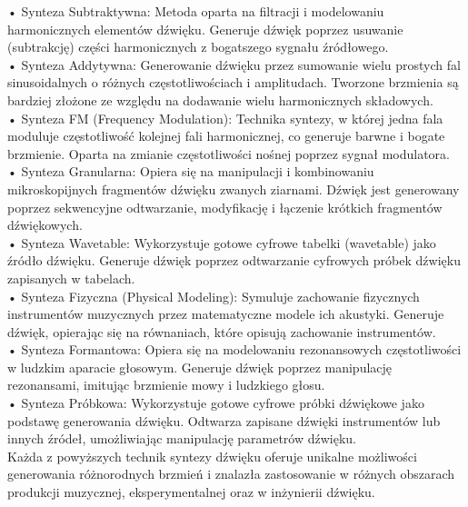 • Synteza Subtraktywna:
Metoda oparta na filtracji i modelowaniu harmonicznych elementów dźwięku.
Generuje dźwięk poprzez usuwanie (subtrakcję) części harmonicznych z bogatszego sygnału źródłowego.\\

• Synteza Addytywna:
Generowanie dźwięku przez sumowanie wielu prostych fal sinusoidalnych o różnych częstotliwościach i amplitudach.
Tworzone brzmienia są bardziej złożone ze względu na dodawanie wielu harmonicznych składowych.\\


• Synteza FM (Frequency Modulation):
Technika syntezy, w której jedna fala moduluje częstotliwość kolejnej fali harmonicznej, co generuje barwne i bogate brzmienie.
Oparta na zmianie częstotliwości nośnej poprzez sygnał modulatora.\\


• Synteza Granularna:
Opiera się na manipulacji i kombinowaniu mikroskopijnych fragmentów dźwięku zwanych ziarnami.
Dźwięk jest generowany poprzez sekwencyjne odtwarzanie, modyfikację i łączenie krótkich fragmentów dźwiękowych.\\

• Synteza Wavetable:
Wykorzystuje gotowe cyfrowe tabelki (wavetable) jako źródło dźwięku.
Generuje dźwięk poprzez odtwarzanie cyfrowych próbek dźwięku zapisanych w tabelach.\\


• Synteza Fizyczna (Physical Modeling):
Symuluje zachowanie fizycznych instrumentów muzycznych przez matematyczne modele ich akustyki.
Generuje dźwięk, opierając się na równaniach, które opisują zachowanie instrumentów.\\



• Synteza Formantowa:
Opiera się na modelowaniu rezonansowych częstotliwości w ludzkim aparacie głosowym.
Generuje dźwięk poprzez manipulację rezonansami, imitując brzmienie mowy i ludzkiego głosu.\\

• Synteza Próbkowa:
Wykorzystuje gotowe cyfrowe próbki dźwiękowe jako podstawę generowania dźwięku.
Odtwarza zapisane dźwięki instrumentów lub innych źródeł, umożliwiając manipulację parametrów dźwięku.\\

	Każda z powyższych technik syntezy dźwięku oferuje unikalne możliwości generowania różnorodnych brzmień i znalazła zastosowanie w różnych obszarach produkcji muzycznej, eksperymentalnej oraz w inżynierii dźwięku.


